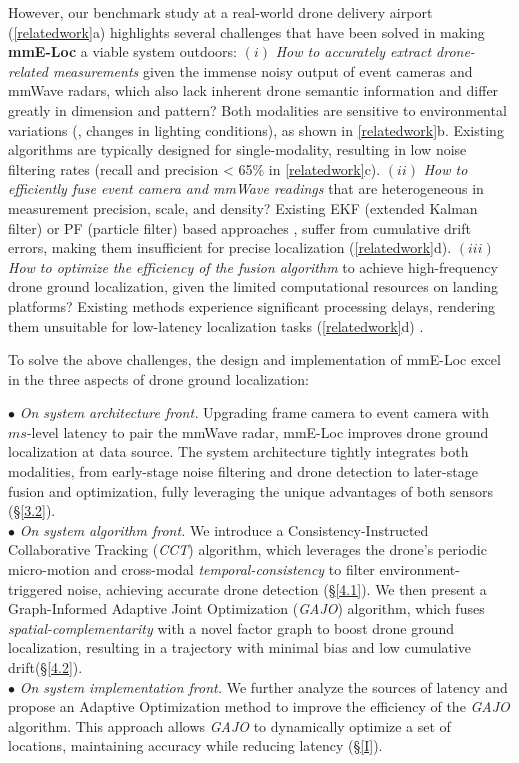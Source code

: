 However, our benchmark study at a real-world drone delivery airport (\fig \ref{relatedwork}a) highlights several challenges that have been solved in making \textbf{mmE-Loc} a viable system outdoors:
$(i)$ \textit{How to accurately extract drone-related measurements} given the immense noisy output of event cameras and mmWave radars, which also lack inherent drone semantic information and differ greatly in dimension and pattern?
Both modalities are sensitive to environmental variations (\eg, changes in lighting conditions), as shown in \fig \ref{relatedwork}b.
Existing algorithms \cite{cao2024virteach, liu2024pmtrack, wang2021asynchronous, alzugaray2018asynchronous} are typically designed for single-modality, resulting in low noise filtering rates (recall and precision < 65\% in \fig \ref{relatedwork}c).
$(ii)$ \textit{How to efficiently fuse event camera and mmWave readings} that are heterogeneous in measurement precision, scale, and density? 
Existing EKF (extended Kalman filter) or PF (particle filter) based approaches \cite{falanga2020dynamic,zhao20213d, mitrokhin2018event}, suffer from cumulative drift errors, making them insufficient for precise localization (\fig \ref{relatedwork}d).
$(iii)$ \textit{How to optimize the efficiency of the fusion algorithm} to achieve high-frequency drone ground localization, given the limited computational resources on landing platforms?
Existing methods experience significant processing delays, rendering them unsuitable for low-latency localization tasks (\fig \ref{relatedwork}d) \cite{zhao20213d, falanga2020dynamic, mitrokhin2018event}.

To solve the above challenges, the design and implementation of mmE-Loc excel in the three aspects of drone ground localization:

\noindent $\bullet$ \textit{On system architecture front.}
Upgrading frame camera to event camera with $ms$-level latency to pair the mmWave radar, mmE-Loc improves drone ground localization at data source.
The system architecture tightly integrates both modalities, from early-stage noise filtering and drone detection to later-stage fusion and optimization, fully leveraging the unique advantages of both sensors (§\ref{3.2}).\\
\noindent $\bullet$ \textit{On system algorithm front.}
We introduce a Consistency-Instructed Collaborative Tracking (\textit{CCT}) algorithm, which leverages the drone's periodic micro-motion and cross-modal \textit{temporal-consistency} to filter environment-triggered noise, achieving accurate drone detection (§\ref{4.1}). 
We then present a Graph-Informed Adaptive Joint Optimization (\textit{GAJO}) algorithm, which fuses \textit{spatial-complementarity} with a novel factor graph to boost drone ground localization, resulting in a trajectory with minimal bias and low cumulative drift(§\ref{4.2}). \\
\noindent $\bullet$ \textit{On system implementation front.}
We further analyze the sources of latency and propose an Adaptive Optimization method to improve the efficiency of the \textit{GAJO} algorithm.
This approach allows \textit{GAJO} to dynamically optimize a set of locations, maintaining accuracy while reducing latency (§\ref{I}).

